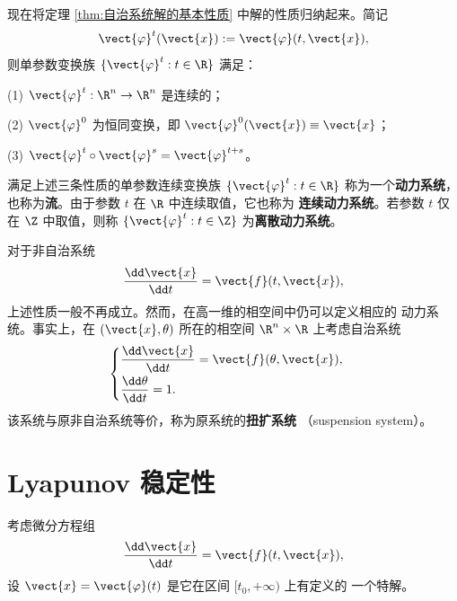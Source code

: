 现在将定理 \ref{thm:自治系统解的基本性质} 中解的性质归纳起来。简记
\[
	\vect{\varphi}^{t}(\vect{x})
	\mathrel{:=}\vect{\varphi}(t,\vect{x}),
\]
则单参数变换族
$\{\vect{\varphi}^{t}:t\in\R\}$ 满足：

\textnormal{(1)} $\vect{\varphi}^{t}:\R^n\to\R^n$ 是连续的；

\textnormal{(2)} $\vect{\varphi}^{0}$ 为恒同变换，即
$\vect{\varphi}^{0}(\vect{x})\equiv\vect{x}$；

\textnormal{(3)}
$\vect{\varphi}^{t}\circ\vect{\varphi}^{s}
=\vect{\varphi}^{t+s}$。

\begin{definition}\label{def:动力系统与流}
	满足上述三条性质的单参数连续变换族
	$\{\vect{\varphi}^{t}:t\in\R\}$ 称为一个\textbf{动力系统}，
	也称为\textbf{流}。由于参数 $t$ 在 $\R$ 中连续取值，它也称为
	\textbf{连续动力系统}。若参数 $t$ 仅在 $\Z$ 中取值，则称
	$\{\vect{\varphi}^{t}:t\in\Z\}$ 为\textbf{离散动力系统}。
\end{definition}

对于非自治系统
\[
	\dfrac{\dd\vect{x}}{\dd t}=\vect{f}(t,\vect{x}),
\]
上述性质一般不再成立。然而，在高一维的相空间中仍可以定义相应的
动力系统。事实上，在 $(\vect{x},\theta)$ 所在的相空间
$\R^n\times\R$ 上考虑自治系统
\[
	\begin{cases}
		\dfrac{\dd\vect{x}}{\dd t}=\vect{f}(\theta,\vect{x}),\\[6pt]
		\dfrac{\dd\theta}{\dd t}=1.
	\end{cases}
\]
该系统与原非自治系统等价，称为原系统的\textbf{扭扩系统}
（suspension system）。

\section{Lyapunov 稳定性}\label{sec:Lyapunov稳定性}

考虑微分方程组
\[
	\dfrac{\dd\vect{x}}{\dd t}=\vect{f}(t,\vect{x}),
\]
设 $\vect{x}=\vect{\varphi}(t)$ 是它在区间 $[t_0,+\infty)$ 上有定义的
一个特解。

